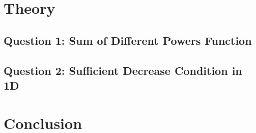 \documentclass[12pt]{article}
\begin{document}
\section{Theory}

\subsection{Question 1: Sum of Different Powers Function}

\subsection{Question 2: Sufficient Decrease Condition in 1D}

\section{Conclusion}
\end{document}
